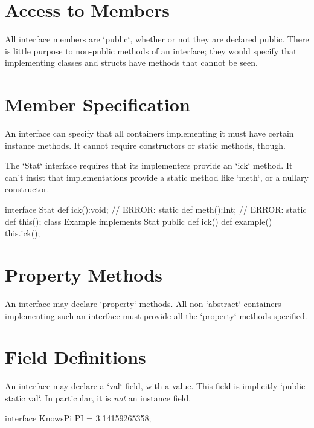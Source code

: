 \section{Access to Members}

All interface members are \xcd`public`, whether or not they are declared
public.  There is little purpose to non-public methods of an interface; they
would specify that implementing classes and structs have methods that cannot
be seen.

\section{Member Specification}

An interface can specify that all containers implementing it must have certain
instance methods.  It cannot require constructors or static methods, though.


\begin{ex}
The \xcd`Stat` interface requires that its implementers provide 
an \xcd`ick` method.  
It can't insist that implementations provide a static method 
like \xcd`meth`, or a nullary constructor.
% 
\begin{xten}
interface Stat {
  def ick():void; 
  // ERROR: static def meth():Int;
  // ERROR: static def this();
}
class Example implements Stat {
  public def ick() {}
  def example() {
     this.ick();
  }
}
\end{xten}
%

\end{ex}

\section{Property Methods}

An interface may declare \xcd`property` methods.  All non-\xcd`abstract`
containers implementing such an interface must provide all the \xcd`property`
methods specified.  

\section{Field Definitions}

An interface may declare a \xcd`val` field, with a value.  This field is implicitly
\xcd`public static val`.  In particular, it is {\em not} an instance field. 
\begin{xten}
interface KnowsPi {
  PI = 3.14159265358;
}
\end{xten}
%

